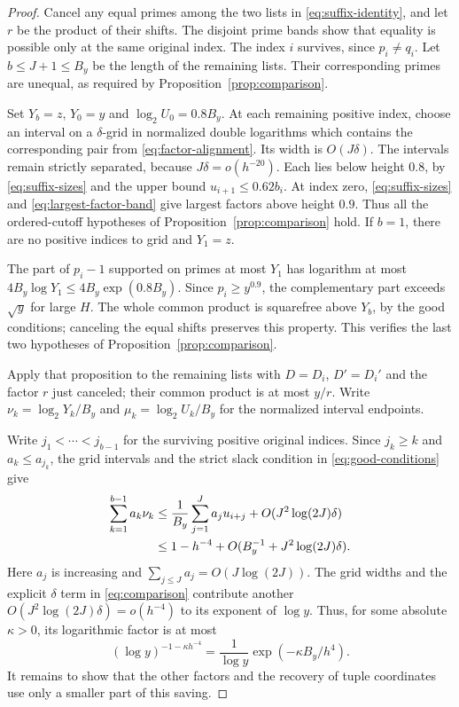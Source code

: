 \begin{proof}
Cancel any equal primes among the two lists in
\eqref{eq:suffix-identity}, and let $r$ be the product of their shifts.
The disjoint prime bands show that equality is possible only at the
same original index.  The index $i$ survives, since $p_i\ne q_i$.
Let $b\le J+1\le B_y$ be the length of the remaining lists.  Their corresponding
primes are unequal, as required by Proposition~\ref{prop:comparison}.

Set $Y_b=z$, $Y_0=y$ and $\log_2U_0=0.8B_y$.  At each remaining
positive index, choose an interval on a $\delta$-grid in normalized
double logarithms which contains the corresponding pair from
\eqref{eq:factor-alignment}.  Its width is $O(J\delta)$.  The intervals
remain strictly separated, because $J\delta=o(h^{-20})$.  Each lies
below height $0.8$, by \eqref{eq:suffix-sizes} and the upper bound
$u_{i+1}\le0.62b_i$.  At index zero,
\eqref{eq:suffix-sizes} and \eqref{eq:largest-factor-band} give largest
factors above height $0.9$.  Thus all the ordered-cutoff hypotheses of
Proposition~\ref{prop:comparison} hold.  If $b=1$, there are no positive
indices to grid and $Y_1=z$.

The part of $p_i-1$ supported on primes at most $Y_1$ has logarithm
at most $4B_y\log Y_1\le4B_y\exp(0.8B_y)$.  Since $p_i\ge y^{0.9}$,
the complementary part exceeds $\sqrt y$ for large $H$.  The whole
common product is squarefree above $Y_b$, by the good conditions;
canceling the equal shifts preserves this property.  This verifies
the last two hypotheses of Proposition~\ref{prop:comparison}.

Apply that proposition to the remaining lists with $D=D_i$, $D'=D_i'$
and the factor $r$ just canceled; their common product is at most $y/r$.
Write $\nu_k=\log_2Y_k/B_y$ and $\mu_k=\log_2U_k/B_y$ for the
normalized interval endpoints.

Write $j_1<\cdots<j_{b-1}$ for the surviving positive original
indices.  Since $j_k\ge k$ and $a_k\le a_{j_k}$, the grid intervals
and the strict slack condition in \eqref{eq:good-conditions} give
\begin{align}
 \sum_{k=1}^{b-1}a_k\nu_k
 &\le \frac{1}{B_y}\sum_{j=1}^{J}a_j u_{i+j}
                          +O(J^2\log(2J)\delta)\notag\\
 &\le1-h^{-4}+O(B_y^{-1}+J^2\log(2J)\delta).
 \label{eq:collision-slack}
\end{align}
Here $a_j$ is increasing and $\sum_{j\le J}a_j=O(J\log(2J))$.
The grid widths and the explicit $\delta$ term in
\eqref{eq:comparison} contribute another
$O(J^2\log(2J)\delta)=o(h^{-4})$ to its exponent of $\log y$.
Thus, for some absolute $\kappa>0$, its logarithmic factor is at most
\[
 (\log y)^{-1-\kappa h^{-4}}
 =\frac1{\log y}\exp(-\kappa B_y/h^4).
\]
It remains to show that the other factors and the recovery of tuple
coordinates use only a smaller part of this saving.


\end{proof}
